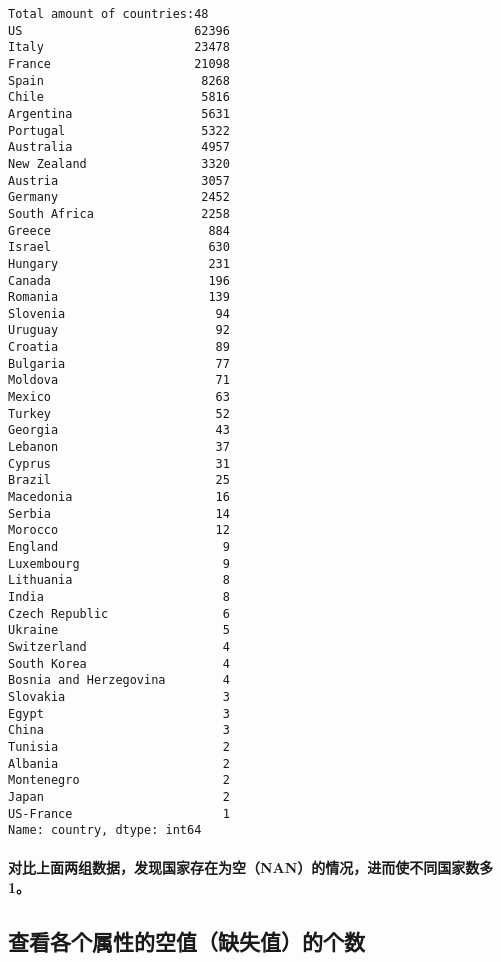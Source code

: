 \documentclass[11pt]{article}
\begin{document}
    \begin{Verbatim}[commandchars=\\\{\}]
Total amount of countries:48
US                        62396
Italy                     23478
France                    21098
Spain                      8268
Chile                      5816
Argentina                  5631
Portugal                   5322
Australia                  4957
New Zealand                3320
Austria                    3057
Germany                    2452
South Africa               2258
Greece                      884
Israel                      630
Hungary                     231
Canada                      196
Romania                     139
Slovenia                     94
Uruguay                      92
Croatia                      89
Bulgaria                     77
Moldova                      71
Mexico                       63
Turkey                       52
Georgia                      43
Lebanon                      37
Cyprus                       31
Brazil                       25
Macedonia                    16
Serbia                       14
Morocco                      12
England                       9
Luxembourg                    9
Lithuania                     8
India                         8
Czech Republic                6
Ukraine                       5
Switzerland                   4
South Korea                   4
Bosnia and Herzegovina        4
Slovakia                      3
Egypt                         3
China                         3
Tunisia                       2
Albania                       2
Montenegro                    2
Japan                         2
US-France                     1
Name: country, dtype: int64
    \end{Verbatim}

    \hypertarget{ux5bf9ux6bd4ux4e0aux9762ux4e24ux7ec4ux6570ux636eux53d1ux73b0ux56fdux5bb6ux5b58ux5728ux4e3aux7a7ananux7684ux60c5ux51b5ux8fdbux800cux4f7fux4e0dux540cux56fdux5bb6ux6570ux591a1}{%
\paragraph{对比上面两组数据，发现国家存在为空（NAN）的情况，进而使不同国家数多1。}\label{ux5bf9ux6bd4ux4e0aux9762ux4e24ux7ec4ux6570ux636eux53d1ux73b0ux56fdux5bb6ux5b58ux5728ux4e3aux7a7ananux7684ux60c5ux51b5ux8fdbux800cux4f7fux4e0dux540cux56fdux5bb6ux6570ux591a1}}

\hypertarget{ux67e5ux770bux5404ux4e2aux5c5eux6027ux7684ux7a7aux503cux7f3aux5931ux503cux7684ux4e2aux6570}{%
\subsection{查看各个属性的空值（缺失值）的个数}\label{ux67e5ux770bux5404ux4e2aux5c5eux6027ux7684ux7a7aux503cux7f3aux5931ux503cux7684ux4e2aux6570}}
\end{document}
